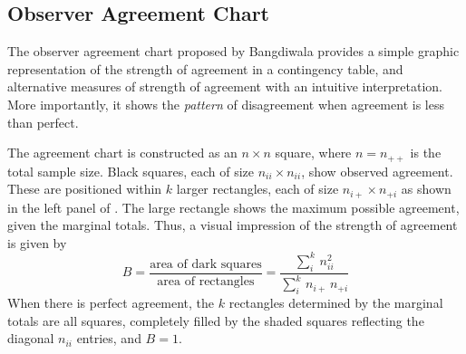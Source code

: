 \documentclass[11pt]{book}
\begin{document}
\subsection[Observer Agreement Chart]{Observer Agreement Chart}
\label{sec:twoway:Bangdiwala}
The observer agreement chart proposed by Bangdiwala
\citeyearpar{Bangdiwala:1985,Bangdiwala:87} provides a simple
graphic representation of the strength of agreement in a contingency
table, and alternative measures of strength of agreement with an intuitive
interpretation. More importantly, it shows the \emph{pattern} of disagreement
when agreement is less than perfect.

The agreement chart is constructed as an \(n \times  n\) square,
where $n = n_{++}$ is the total sample size.  Black squares, each of size
\(n_{ii} \times  n_{ii}\), show observed agreement.  These are positioned
within $k$ larger rectangles, each of size \(n_{i+} \times  n_{+i}\)
as shown in the left panel of
.  The
large rectangle shows the maximum possible agreement, given the
marginal totals.  Thus, a visual impression of the strength of
agreement is given by
\begin{equation}\label{eq:bangb}
  B  =
  \frac{ \mbox{area of dark squares}}
  { \mbox{area of rectangles}}  =
  \frac{ \sum_i^k \,  n_{ii}^2 }
  { \sum_i^k \,  n_{i+} \,  n_{+i} }
\end{equation}
When there is perfect agreement, the $k$ rectangles determined by the
marginal totals are all squares, completely filled by the shaded squares
reflecting the diagonal $n_{ii}$ entries, and $B = 1$. 
\end{document}
